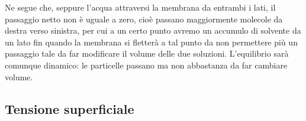 Ne segue che, seppure l'acqua attraversi la membrana da entrambi i lati, il passaggio netto non è uguale a zero, cioè passano maggiormente molecole da destra verso sinistra, per cui a un certo punto avremo un accumulo di solvente da un lato fin quando la membrana si fletterà a tal punto da non permettere più un passaggio tale da far modificare il volume delle due soluzioni. L'equilibrio sarà comunque dinamico: le particelle passano ma non abbastanza da far cambiare volume.
\subsection{Tensione superficiale}